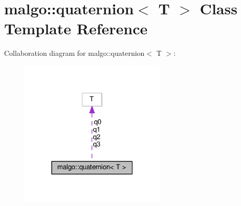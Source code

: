 \hypertarget{classmalgo_1_1quaternion}{}\section{malgo\+:\+:quaternion$<$ T $>$ Class Template Reference}
\label{classmalgo_1_1quaternion}


Collaboration diagram for malgo\+:\+:quaternion$<$ T $>$\+:
\nopagebreak
\begin{figure}[H]
\begin{center}
\leavevmode
\includegraphics[width=198pt]{classmalgo_1_1quaternion__coll__graph}
\end{center}
\end{figure}
